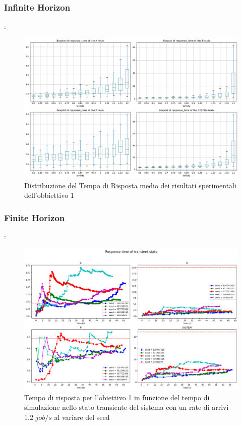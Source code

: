 \subsubsection{Infinite Horizon}
\begin{frame}{\subsecname: \subsubsecname}
    \begin{figure}
        \centering
        \includegraphics[width=0.75\linewidth]{figs/results/obj1/obj1-box-response-time.png}
        \caption{Distribuzione del Tempo di Risposta medio dei risultati sperimentali dell’obbiettivo 1}
        \label{fig:enter-label}
    \end{figure}
\end{frame}

\subsubsection{Finite Horizon}
\begin{frame}{\subsecname: \subsubsecname}
    \begin{figure}
        \centering
        \includegraphics[width=0.75\linewidth]{figs/appendices/transient/obj1-transient-rtime-analitycal.png}
        \caption{Tempo di risposta per l’obiettivo 1 in funzione del tempo di simulazione nello stato transiente del sistema con un rate di arrivi 1.2 $job/s$ al variare del seed}
        \label{fig:enter-label}
    \end{figure}
\end{frame}

